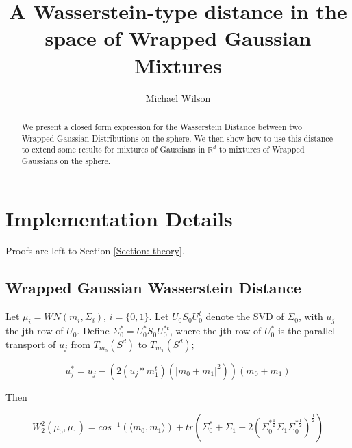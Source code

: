 \documentclass[]{article}
\title{A Wasserstein-type distance in the space of Wrapped Gaussian Mixtures}
\author{Michael Wilson}
\date{}
\begin{document}
	
	\maketitle
	
	\begin{abstract}
	We present a closed form expression for the Wasserstein Distance between two Wrapped Gaussian Distributions on the sphere. We then show how to use this distance to extend some results for mixtures of Gaussians in $\mathbb{R}^d$ to mixtures of Wrapped Gaussians on the sphere.  
	\end{abstract}


\section{Implementation Details}

Proofs are left to Section \ref{Section: theory}.

\subsection{Wrapped Gaussian Wasserstein Distance}

Let $\mu_i = WN(m_i,\Sigma_i)$, $i = \{0, 1\}$. Let $U_0 S_0 U_0^t$ denote the SVD of $\Sigma_0$, with $u_j$ the jth row of $U_0$. Define $\Sigma_0^* = U_0^* S_0 U_0^{*t}$, where the jth row of $U_0^*$ is the parallel transport of $u_j$ from $T_{m_0}(S^d)$ to $T_{m_1}(S^d)$;

%

\begin{equation*}
	u_j^{*} = u_j - (2(u_j*m_1^t)(|m_0 +m_1|^2))(m_0 + m_1)
\end{equation*} 

Then 

\begin{equation*}
	W_2^2(\mu_0,\mu_1) = cos^{-1}(\langle m_0,m_1 \rangle) + tr(\Sigma_0^* + \Sigma_1 - 2 (\Sigma_0^{*\frac{1}{2}} \Sigma_1 \Sigma_0^{*\frac{1}{2}})^{\frac{1}{2}}) 
\end{equation*}
\end{document}
